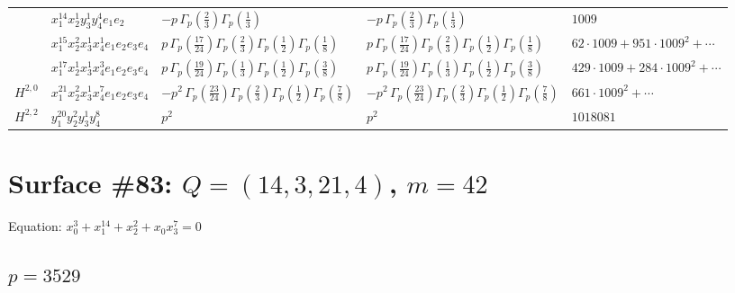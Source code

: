 \documentclass[11pt]{article}
\begin{document}
\begin{table}[ht]
{\begin{tabular}{@{}lllll@{}}
 & $x_{1}^{14} x_{2}^{1} y_{3}^{1} y_{4}^{4} e_{1} e_{2}$ & $- p \, \Gamma_p \left( \frac{2}{3} \right) \Gamma_p \left( \frac{1}{3} \right)$ & $- p \, \Gamma_p \left( \frac{2}{3} \right) \Gamma_p \left( \frac{1}{3} \right)$ & $1009$ \\
 & $x_{1}^{15} x_{2}^{2} x_{3}^{1} x_{4}^{1}  e_{1} e_{2} e_{3} e_{4}$ & $p \, \Gamma_p \left( \frac{17}{24} \right) \Gamma_p \left( \frac{2}{3} \right) \Gamma_p \left( \frac{1}{2} \right) \Gamma_p \left( \frac{1}{8} \right)$ & $p \, \Gamma_p \left( \frac{17}{24} \right) \Gamma_p \left( \frac{2}{3} \right) \Gamma_p \left( \frac{1}{2} \right) \Gamma_p \left( \frac{1}{8} \right)$ & $62{\cdot}1009{+}951{\cdot}1009^{2}{+}\cdots$ \\
 & $x_{1}^{17} x_{2}^{1} x_{3}^{1} x_{4}^{3}  e_{1} e_{2} e_{3} e_{4}$ & $p \, \Gamma_p \left( \frac{19}{24} \right) \Gamma_p \left( \frac{1}{3} \right) \Gamma_p \left( \frac{1}{2} \right) \Gamma_p \left( \frac{3}{8} \right)$ & $p \, \Gamma_p \left( \frac{19}{24} \right) \Gamma_p \left( \frac{1}{3} \right) \Gamma_p \left( \frac{1}{2} \right) \Gamma_p \left( \frac{3}{8} \right)$ & $429{\cdot}1009{+}284{\cdot}1009^{2}{+}\cdots$ \\
\midrule
$H^{2,0}$ & $x_{1}^{21} x_{2}^{2} x_{3}^{1} x_{4}^{7}  e_{1} e_{2} e_{3} e_{4}$ & $- p^{2} \, \Gamma_p \left( \frac{23}{24} \right) \Gamma_p \left( \frac{2}{3} \right) \Gamma_p \left( \frac{1}{2} \right) \Gamma_p \left( \frac{7}{8} \right)$ & $- p^{2} \, \Gamma_p \left( \frac{23}{24} \right) \Gamma_p \left( \frac{2}{3} \right) \Gamma_p \left( \frac{1}{2} \right) \Gamma_p \left( \frac{7}{8} \right)$ & $661{\cdot}1009^{2}{+}\cdots$ \\
\midrule
$H^{2,2}$ & $y_{1}^{20} y_{2}^{2} y_{3}^{1} y_{4}^{8}$ & $p^{2} \,$ & $p^{2} \,$ & $1018081$ \\
\bottomrule
\end{tabular}
}
\renewcommand{\arraystretch}{1.0}
\end{table}

\newpage

\section*{Surface \#83: $Q=(14, 3, 21, 4)$, $m=42$}

Equation: $x_0^{3} + x_1^{14} + x_2^{2} + x_0 x_3^{7} = 0$

\subsection*{$p = 3529$}
\end{document}
